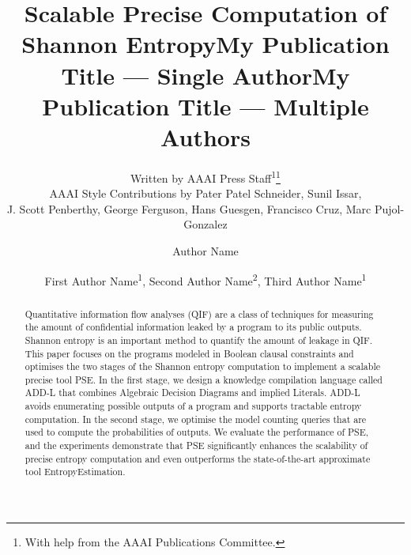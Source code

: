 \documentclass[letterpaper]{article} %
\title{Scalable Precise Computation of Shannon Entropy}
\author{
Written by AAAI Press Staff\textsuperscript{\rm 1}\thanks{With help from the AAAI Publications Committee.}\\
AAAI Style Contributions by Pater Patel Schneider,
Sunil Issar,\\
J. Scott Penberthy,
George Ferguson,
Hans Guesgen,
Francisco Cruz\equalcontrib,
Marc Pujol-Gonzalez\equalcontrib
}
\title{My Publication Title --- Single Author}
\author {
Author Name
}
\title{My Publication Title --- Multiple Authors}
\author {
First Author Name\textsuperscript{\rm 1},
Second Author Name\textsuperscript{\rm 2},
Third Author Name\textsuperscript{\rm 1}
}
\begin{document}
%


\begin{abstract}
	Quantitative information flow analyses (QIF) are a class of techniques for measuring the amount of confidential information leaked by a program to its public outputs. 
	Shannon entropy is an important method to quantify the amount of leakage in QIF.
	This paper focuses on the programs modeled in Boolean clausal constraints and optimises the two stages of the Shannon entropy computation to implement a scalable precise tool PSE.
	In the first stage, we design a knowledge compilation language called ADD-L that combines Algebraic Decision Diagrams and implied Literals.
	ADD-L avoids enumerating possible outputs of a program and supports tractable entropy computation. 
	In the second stage, we optimise the model counting queries that are used to compute the probabilities of outputs. 
	We evaluate the performance of PSE, and the experiments demonstrate that PSE significantly enhances the scalability of precise entropy computation and even outperforms the state-of-the-art approximate tool EntropyEstimation.
\end{abstract}




















\end{document}
